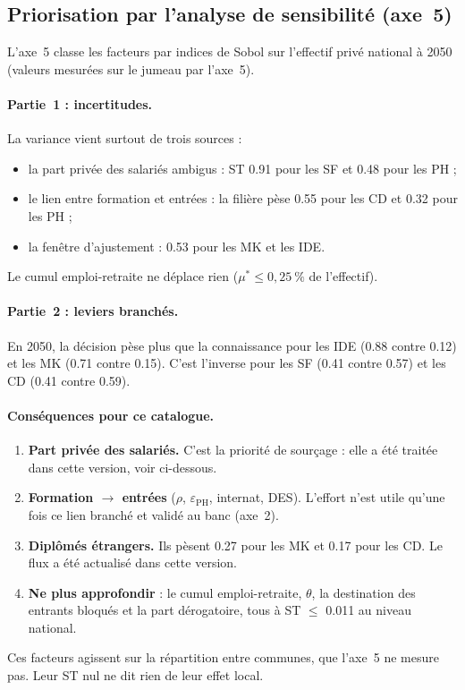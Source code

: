 \documentclass[11pt]{article}
\begin{document}
\subsection{Priorisation par l'analyse de sensibilité (axe~5)}

L'axe~5 classe les facteurs par indices de Sobol sur l'effectif privé
national à 2050 (valeurs mesurées sur le jumeau par l'axe~5).

\paragraph{Partie~1 : incertitudes.}
La variance vient surtout de trois sources :
\begin{itemize}
\item la part privée des salariés ambigus : ST \num{0.91} pour les SF et
  \num{0.48} pour les PH ;
\item le lien entre formation et entrées : la filière pèse \num{0.55} pour
  les CD et \num{0.32} pour les PH ;
\item la fenêtre d'ajustement : \num{0.53} pour les MK et les IDE.
\end{itemize}
Le cumul emploi-retraite ne déplace rien ($\mu^* \le 0,25~\%$ de l'effectif).

\paragraph{Partie~2 : leviers branchés.}
En 2050, la décision pèse plus que la connaissance pour les IDE
(\num{0.88} contre \num{0.12}) et les MK (\num{0.71} contre \num{0.15}).
C'est l'inverse pour les SF (\num{0.41} contre \num{0.57}) et les CD
(\num{0.41} contre \num{0.59}).

\paragraph{Conséquences pour ce catalogue.}
\begin{enumerate}
\item \textbf{Part privée des salariés.} C'est la priorité de sourçage :
  elle a été traitée dans cette version, voir ci-dessous.
\item \textbf{Formation $\to$ entrées} ($\rho$, $\varepsilon_{\mathrm{PH}}$,
  internat, DES). L'effort n'est utile qu'une fois ce lien branché et
  validé au banc (axe~2).
\item \textbf{Diplômés étrangers.} Ils pèsent \num{0.27} pour les MK et
  \num{0.17} pour les CD. Le flux a été actualisé dans cette version.
\item \textbf{Ne plus approfondir} : le cumul emploi-retraite, $\theta$, la
  destination des entrants bloqués et la part dérogatoire, tous à ST
  $\le$ \num{0.011} au niveau national.
\end{enumerate}
Ces facteurs agissent sur la répartition entre communes, que l'axe~5 ne
mesure pas. Leur ST nul ne dit rien de leur effet local.
\end{document}
